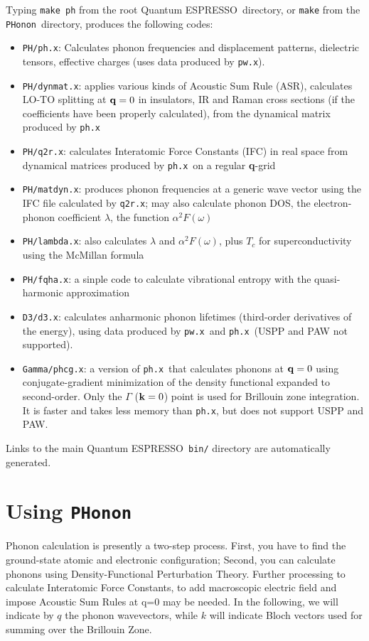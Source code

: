 \documentclass[12pt,a4paper]{article}
\def\qe{{\sc Quantum ESPRESSO}}
\def\pwx{\texttt{pw.x}}
\def\phx{\texttt{ph.x}}
\def\PHonon{\texttt{PHonon}}
\begin{document}
Typing \texttt{make ph} from the root \qe\ directory, or \texttt{make} 
from the \PHonon\ directory, produces the following codes:
\begin{itemize}
  \item \texttt{PH/ph.x}: Calculates phonon frequencies and displacement patterns,
    dielectric tensors, effective charges (uses data produced by \pwx). 
  \item \texttt{PH/dynmat.x}: applies various kinds of Acoustic Sum Rule (ASR),
    calculates LO-TO splitting at ${\bf q} = 0$ in insulators, IR and Raman
    cross sections (if the coefficients have been properly calculated),
    from the dynamical matrix produced by \phx
  \item \texttt{PH/q2r.x}: calculates Interatomic Force Constants (IFC) in real space
    from dynamical matrices produced by \phx\ on a regular {\bf q}-grid 
 \item \texttt{PH/matdyn.x}: produces phonon frequencies at a generic wave vector
    using the IFC file calculated by \texttt{q2r.x}; may also calculate phonon DOS, 
    the electron-phonon coefficient $\lambda$, the function $\alpha^2F(\omega)$
\item \texttt{PH/lambda.x}: also calculates $\lambda$ and $\alpha^2F(\omega)$,
   plus $T_c$ for  superconductivity using the McMillan formula
\item \texttt{PH/fqha.x}: a sinple code to calculate vibrational entropy with
   the quasi-harmonic approximation
\item \texttt{D3/d3.x}:
  calculates anharmonic phonon lifetimes (third-order derivatives
  of the energy), using data produced by \pwx\ and \phx\ (USPP 
  and PAW not supported). 
\item \texttt{Gamma/phcg.x}: 
  a version of \phx\ that calculates phonons at ${\bf q} = 0$ using
  conjugate-gradient minimization of the density functional expanded to
  second-order. Only the $\Gamma$ (${\bf k} = 0$) point is used for Brillouin zone
  integration. It is faster and takes less memory than \phx, but does
  not support USPP and PAW.
\end{itemize}
Links to the main \qe\ \texttt{bin/} directory are automatically generated.
   
\section{Using \PHonon}

Phonon calculation is presently a two-step process.
First, you have to find the ground-state atomic and electronic configuration;
Second, you can calculate phonons using Density-Functional Perturbation Theory.
Further processing to calculate Interatomic Force Constants, to add macroscopic
electric field and impose Acoustic Sum Rules at q=0 may be needed.
In the following, we will indicate by $q$ the phonon wavevectors, 
while $k$ will indicate Bloch vectors used for summing over the Brillouin Zone.
\end{document}
